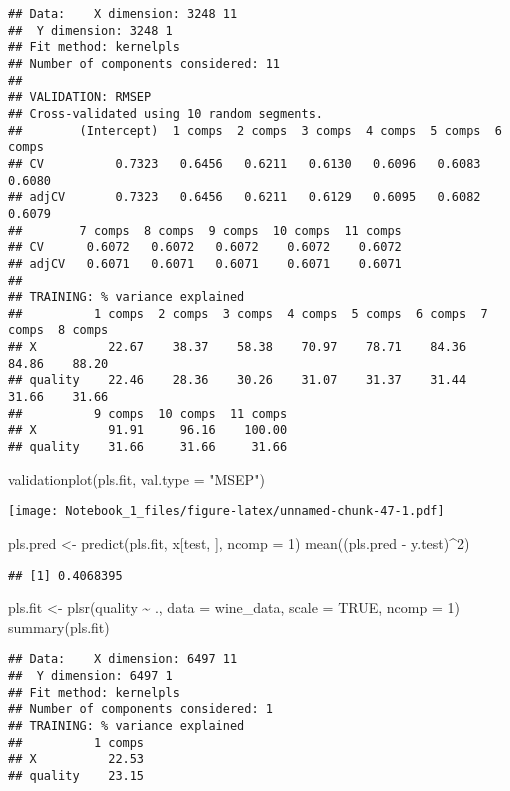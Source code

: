 \documentclass[
]{article}
\newenvironment{Shaded}{\begin{snugshade}}{\end{snugshade}}
\newcommand{\AttributeTok}[1]{\textcolor[rgb]{0.77,0.63,0.00}{#1}}
\newcommand{\ConstantTok}[1]{\textcolor[rgb]{0.00,0.00,0.00}{#1}}
\newcommand{\DecValTok}[1]{\textcolor[rgb]{0.00,0.00,0.81}{#1}}
\newcommand{\FunctionTok}[1]{\textcolor[rgb]{0.00,0.00,0.00}{#1}}
\newcommand{\NormalTok}[1]{#1}
\newcommand{\OtherTok}[1]{\textcolor[rgb]{0.56,0.35,0.01}{#1}}
\newcommand{\SpecialCharTok}[1]{\textcolor[rgb]{0.00,0.00,0.00}{#1}}
\newcommand{\StringTok}[1]{\textcolor[rgb]{0.31,0.60,0.02}{#1}}
\begin{document}
\begin{verbatim}
## Data:    X dimension: 3248 11 
##  Y dimension: 3248 1
## Fit method: kernelpls
## Number of components considered: 11
## 
## VALIDATION: RMSEP
## Cross-validated using 10 random segments.
##        (Intercept)  1 comps  2 comps  3 comps  4 comps  5 comps  6 comps
## CV          0.7323   0.6456   0.6211   0.6130   0.6096   0.6083   0.6080
## adjCV       0.7323   0.6456   0.6211   0.6129   0.6095   0.6082   0.6079
##        7 comps  8 comps  9 comps  10 comps  11 comps
## CV      0.6072   0.6072   0.6072    0.6072    0.6072
## adjCV   0.6071   0.6071   0.6071    0.6071    0.6071
## 
## TRAINING: % variance explained
##          1 comps  2 comps  3 comps  4 comps  5 comps  6 comps  7 comps  8 comps
## X          22.67    38.37    58.38    70.97    78.71    84.36    84.86    88.20
## quality    22.46    28.36    30.26    31.07    31.37    31.44    31.66    31.66
##          9 comps  10 comps  11 comps
## X          91.91     96.16    100.00
## quality    31.66     31.66     31.66
\end{verbatim}

\begin{Shaded}
\begin{Highlighting}[]
\FunctionTok{validationplot}\NormalTok{(pls.fit, }\AttributeTok{val.type =} \StringTok{"MSEP"}\NormalTok{)}
\end{Highlighting}
\end{Shaded}

\texttt{[image: Notebook\_1\_files/figure-latex/unnamed-chunk-47-1.pdf]}

\begin{Shaded}
\begin{Highlighting}[]
\NormalTok{pls.pred }\OtherTok{\textless{}{-}} \FunctionTok{predict}\NormalTok{(pls.fit, x[test, ], }\AttributeTok{ncomp =} \DecValTok{1}\NormalTok{)}
\FunctionTok{mean}\NormalTok{((pls.pred }\SpecialCharTok{{-}}\NormalTok{ y.test)}\SpecialCharTok{\^{}}\DecValTok{2}\NormalTok{)}
\end{Highlighting}
\end{Shaded}

\begin{verbatim}
## [1] 0.4068395
\end{verbatim}

\begin{Shaded}
\begin{Highlighting}[]
\NormalTok{pls.fit }\OtherTok{\textless{}{-}} \FunctionTok{plsr}\NormalTok{(quality }\SpecialCharTok{\textasciitilde{}}\NormalTok{ ., }\AttributeTok{data =}\NormalTok{ wine\_data, }\AttributeTok{scale =} \ConstantTok{TRUE}\NormalTok{, }\AttributeTok{ncomp =} \DecValTok{1}\NormalTok{)}
\FunctionTok{summary}\NormalTok{(pls.fit)}
\end{Highlighting}
\end{Shaded}

\begin{verbatim}
## Data:    X dimension: 6497 11 
##  Y dimension: 6497 1
## Fit method: kernelpls
## Number of components considered: 1
## TRAINING: % variance explained
##          1 comps
## X          22.53
## quality    23.15
\end{verbatim}
\end{document}

